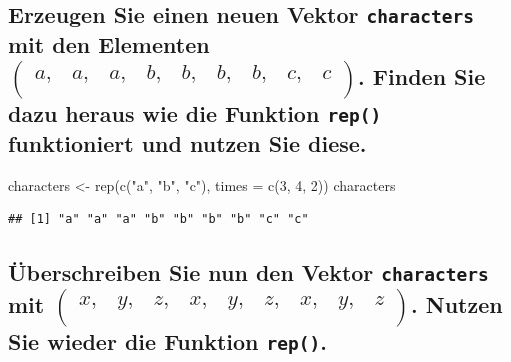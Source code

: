 \documentclass[12pt,a4paper]{article}
\newenvironment{Shaded}{\begin{snugshade}}{\end{snugshade}}
\newcommand{\AttributeTok}[1]{\textcolor[rgb]{0.77,0.63,0.00}{#1}}
\newcommand{\DecValTok}[1]{\textcolor[rgb]{0.00,0.00,0.81}{#1}}
\newcommand{\FunctionTok}[1]{\textcolor[rgb]{0.00,0.00,0.00}{#1}}
\newcommand{\NormalTok}[1]{#1}
\newcommand{\OtherTok}[1]{\textcolor[rgb]{0.56,0.35,0.01}{#1}}
\newcommand{\StringTok}[1]{\textcolor[rgb]{0.31,0.60,0.02}{#1}}
\begin{document}
\hypertarget{erzeugen-sie-einen-neuen-vektor-mit-den-elementen-beginpmatrix-a-a-a-b-b-b-b-c-c-endpmatrix.-finden-sie-dazu-heraus-wie-die-funktion-funktioniert-und-nutzen-sie-diese.}{%
\subsection{\texorpdfstring{Erzeugen Sie einen neuen Vektor
\texttt{characters} mit den Elementen
\(\begin{pmatrix} a, & a, & a, & b, & b, & b, & b, & c, & c \\ \end{pmatrix}\).
Finden Sie dazu heraus wie die Funktion \texttt{rep()} funktioniert und
nutzen Sie
diese.}{Erzeugen Sie einen neuen Vektor  mit den Elementen \textbackslash begin\{pmatrix\} a, \& a, \& a, \& b, \& b, \& b, \& b, \& c, \& c \textbackslash\textbackslash{} \textbackslash end\{pmatrix\}. Finden Sie dazu heraus wie die Funktion  funktioniert und nutzen Sie diese.}}\label{erzeugen-sie-einen-neuen-vektor-mit-den-elementen-beginpmatrix-a-a-a-b-b-b-b-c-c-endpmatrix.-finden-sie-dazu-heraus-wie-die-funktion-funktioniert-und-nutzen-sie-diese.}}

\begin{Shaded}
\begin{Highlighting}[]
\NormalTok{    characters }\OtherTok{\textless{}{-}} \FunctionTok{rep}\NormalTok{(}\FunctionTok{c}\NormalTok{(}\StringTok{"a"}\NormalTok{, }\StringTok{"b"}\NormalTok{, }\StringTok{"c"}\NormalTok{), }\AttributeTok{times =} \FunctionTok{c}\NormalTok{(}\DecValTok{3}\NormalTok{, }\DecValTok{4}\NormalTok{, }\DecValTok{2}\NormalTok{))}
\NormalTok{    characters}
\end{Highlighting}
\end{Shaded}

\begin{verbatim}
## [1] "a" "a" "a" "b" "b" "b" "b" "c" "c"
\end{verbatim}

\vspace{0.5cm}

\hypertarget{uxfcberschreiben-sie-nun-den-vektor-mit-beginpmatrix-x-y-z-x-y-z-x-y-z-endpmatrix.-nutzen-sie-wieder-die-funktion-.}{%
\subsection{\texorpdfstring{Überschreiben Sie nun den Vektor
\texttt{characters} mit
\linebreak  \(\begin{pmatrix} x, & y, & z, & x, & y, & z, & x, & y, & z \\ \end{pmatrix}\).
Nutzen Sie wieder die Funktion
\texttt{rep()}.}{Überschreiben Sie nun den Vektor  mit \textbackslash begin\{pmatrix\} x, \& y, \& z, \& x, \& y, \& z, \& x, \& y, \& z \textbackslash\textbackslash{} \textbackslash end\{pmatrix\}. Nutzen Sie wieder die Funktion .}}\label{uxfcberschreiben-sie-nun-den-vektor-mit-beginpmatrix-x-y-z-x-y-z-x-y-z-endpmatrix.-nutzen-sie-wieder-die-funktion-.}}
\end{document}
